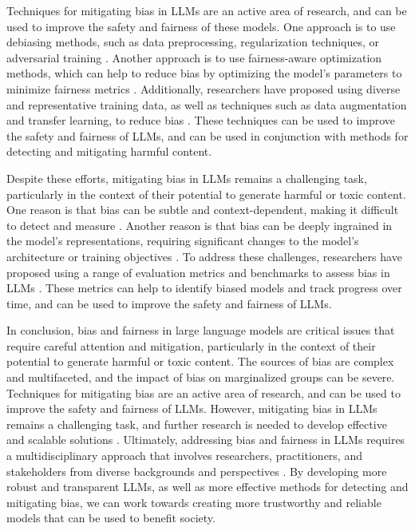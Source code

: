 \documentclass[11pt]{article}
\begin{document}
Techniques for mitigating bias in LLMs are an active area of research, and can be used to improve the safety and fairness of these models. One approach is to use debiasing methods, such as data preprocessing, regularization techniques, or adversarial training \cite{ref315}. Another approach is to use fairness-aware optimization methods, which can help to reduce bias by optimizing the model's parameters to minimize fairness metrics \cite{ref316}. Additionally, researchers have proposed using diverse and representative training data, as well as techniques such as data augmentation and transfer learning, to reduce bias \cite{ref317}. These techniques can be used to improve the safety and fairness of LLMs, and can be used in conjunction with methods for detecting and mitigating harmful content.

Despite these efforts, mitigating bias in LLMs remains a challenging task, particularly in the context of their potential to generate harmful or toxic content. One reason is that bias can be subtle and context-dependent, making it difficult to detect and measure \cite{ref318}. Another reason is that bias can be deeply ingrained in the model's representations, requiring significant changes to the model's architecture or training objectives \cite{ref252}. To address these challenges, researchers have proposed using a range of evaluation metrics and benchmarks to assess bias in LLMs \cite{ref319}. These metrics can help to identify biased models and track progress over time, and can be used to improve the safety and fairness of LLMs.

In conclusion, bias and fairness in large language models are critical issues that require careful attention and mitigation, particularly in the context of their potential to generate harmful or toxic content. The sources of bias are complex and multifaceted, and the impact of bias on marginalized groups can be severe. Techniques for mitigating bias are an active area of research, and can be used to improve the safety and fairness of LLMs. However, mitigating bias in LLMs remains a challenging task, and further research is needed to develop effective and scalable solutions \cite{ref320}. Ultimately, addressing bias and fairness in LLMs requires a multidisciplinary approach that involves researchers, practitioners, and stakeholders from diverse backgrounds and perspectives \cite{ref321}. By developing more robust and transparent LLMs, as well as more effective methods for detecting and mitigating bias, we can work towards creating more trustworthy and reliable models that can be used to benefit society.
\end{document}
